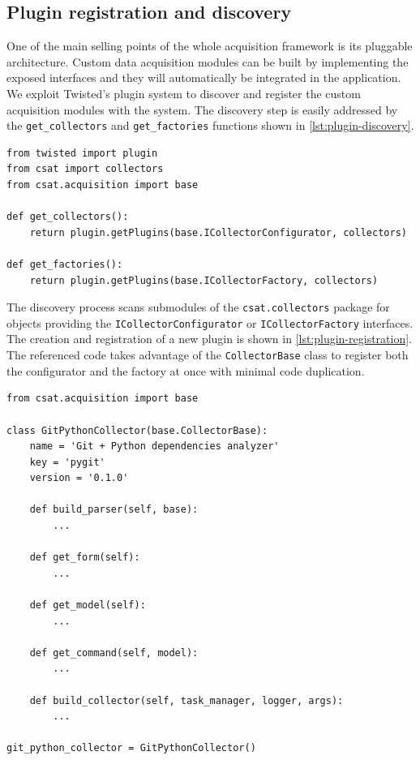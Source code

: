 \subsection{Plugin registration and discovery}

One of the main selling points of the whole acquisition framework is its pluggable architecture. Custom data acquisition modules can be built by implementing the exposed interfaces and they will automatically be integrated in the application. We exploit Twisted's plugin system to discover and register the custom acquisition modules with the system. The discovery step is easily addressed by the \texttt{get\_collectors} and \texttt{get\_factories} functions shown in \vref{lst:plugin-discovery}.

\begin{lstlisting}[caption={Custom acquisition modules discovery.},label=lst:plugin-discovery]
from twisted import plugin
from csat import collectors
from csat.acquisition import base

def get_collectors():
    return plugin.getPlugins(base.ICollectorConfigurator, collectors)

def get_factories():
    return plugin.getPlugins(base.ICollectorFactory, collectors)
\end{lstlisting}

The discovery process scans submodules of the \texttt{csat.collectors} package for objects providing the \texttt{ICollectorConfigurator} or \texttt{ICollectorFactory} interfaces. The creation and registration of a new plugin is shown in \vref{lst:plugin-registration}. The referenced code takes advantage of the \texttt{CollectorBase} class to register both the configurator and the factory at once with minimal code duplication.

\begin{lstlisting}[caption={Registration of a custom acquisition module.},label=lst:plugin-registration]
from csat.acquisition import base

class GitPythonCollector(base.CollectorBase):
    name = 'Git + Python dependencies analyzer'
    key = 'pygit'
    version = '0.1.0'

    def build_parser(self, base):
        ...

    def get_form(self):
        ...

    def get_model(self):
        ...

    def get_command(self, model):
        ...

    def build_collector(self, task_manager, logger, args):
        ...

git_python_collector = GitPythonCollector()
\end{lstlisting}

